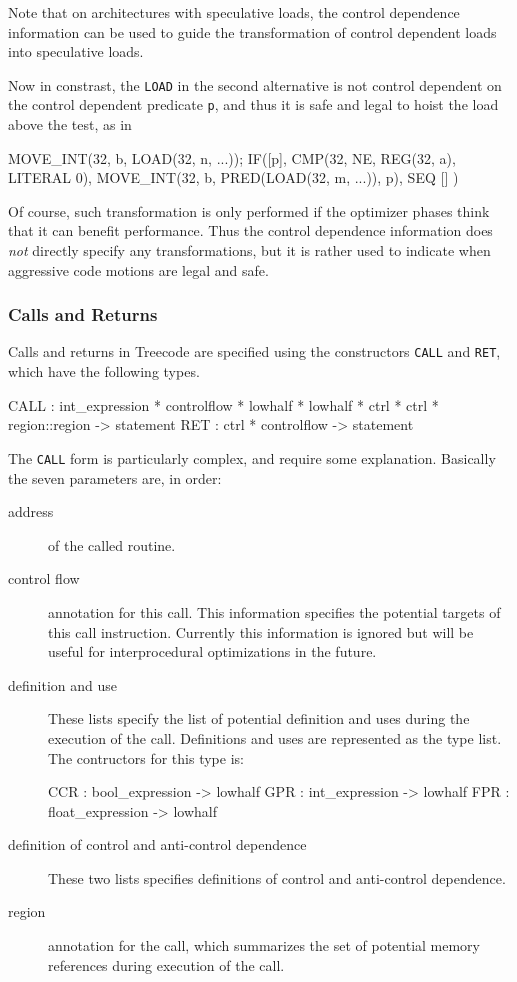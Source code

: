 Note that on architectures with speculative loads, 
the control dependence information can be used to 
guide the transformation of control dependent loads into speculative loads.

Now in constrast, the \verb|LOAD| in the second alternative is not
control dependent on the control dependent predicate \verb|p|, and
thus it is safe and legal to hoist the load above the test, as in
\begin{SML}
   MOVE_INT(32, b, LOAD(32, n, ...));
   IF([p], CMP(32, NE, REG(32, a), LITERAL 0),
        MOVE_INT(32, b, PRED(LOAD(32, m, ...)), p),
        SEQ []
     )
\end{SML}
Of course, such transformation is only performed if the optimizer
phases think that it can benefit performance.  Thus the control dependence
information does \emph{not} directly specify any transformations, but it
is rather used to indicate when aggressive code motions are legal and safe.

\subsubsection{Calls and Returns}

Calls and returns in Treecode are specified using the constructors
\verb|CALL| and \verb|RET|, which have the following types.
\begin{SML}
   CALL : int_expression * controlflow * lowhalf * lowhalf * 
          ctrl * ctrl * region::region -> statement
   RET  : ctrl * controlflow -> statement
\end{SML}

The \verb|CALL| form is particularly complex, and require some explanation.
Basically the seven parameters are, in order:
\begin{description}
   \item[address] of the called routine.
   \item[control flow] annotation for this call.  This information 
specifies the potential targets of this call instruction.  Currently
this information is ignored but will be useful for interprocedural   
optimizations in the future.
   \item[definition and use]  These lists specify the list of
potential definition and uses during the execution of the call.
Definitions and uses are represented as the type  list.
The contructors for this type is:
\begin{SML}
  CCR : bool_expression -> lowhalf
  GPR : int_expression -> lowhalf
  FPR : float_expression -> lowhalf
\end{SML}
   \item[definition of control and anti-control dependence] 
These two lists specifies definitions of control and anti-control dependence.
   \item[region] annotation for the call, which summarizes
the set of potential memory references during execution of the call.
\end{description}

